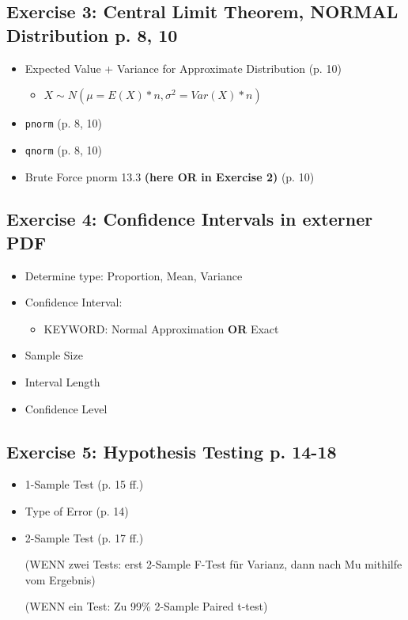 \subsection*{Exercise 3: Central Limit Theorem, NORMAL Distribution p. 8, 10}
\begin{itemize}
    \item Expected Value + Variance for Approximate Distribution (p. 10)
          \begin{itemize}
              \item $X \sim N(\mu = E(X) * n, \sigma^2 = Var(X) * n)$
          \end{itemize}
    \item \texttt{pnorm} (p. 8, 10)
    \item \texttt{qnorm} (p. 8, 10)
    \item Brute Force pnorm 13.3 \textbf{(here OR in Exercise 2)} (p. 10)
\end{itemize}

\subsection*{Exercise 4: Confidence Intervals in externer PDF}
\begin{itemize}
    \item Determine type: Proportion, Mean, Variance
    \item Confidence Interval:  
          \begin{itemize}
              \item KEYWORD: Normal Approximation \textbf{OR} Exact
          \end{itemize}
    \item Sample Size
    \item Interval Length
    \item Confidence Level
\end{itemize}

\subsection*{Exercise 5: Hypothesis Testing p. 14-18}
\begin{itemize}
    \item 1-Sample Test (p. 15 ff.)
    \item Type of Error (p. 14)
    \item 2-Sample Test (p. 17 ff.) 
    
    (WENN zwei Tests: erst 2-Sample F-Test für Varianz, dann nach Mu mithilfe vom Ergebnis) 
    
    (WENN ein Test: Zu 99\% 2-Sample Paired t-test) 
\end{itemize}
